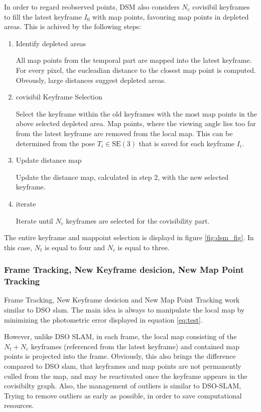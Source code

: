 	In order to regard reobserved points, DSM also considers $N_c$ covisibil keyframes to fill the latest keyframe $I_0$ with map points, favouring 
	map points in depleted areas. This is achived by the following steps: 
	
	\begin{enumerate}
	\item{Identify depleted areas}
	
	All map points from the temporal part are mapped into the latest keyframe. For every pixel, the eucleadian distance to the closest map point 
	is computed. Obvously, large distances suggest depleted areas.
	
	\item{covisibil Keyframe Selection}
	
	Select the keyframe within the old keyframes with the most map points in the above selected depleted area. Map points, where the viewing angle 
	lies too far from the latest keyframe are removed from the local map. 
	This can be determined from the pose $T_i \in \text{SE}(3)$ that is saved for each keyframe $I_i$. 
	
	\item{Update distance map}
	
	Update the distance map, calculated in step 2, with the new selected keyframe. 
	
	\item{iterate}
	
	Iterate until $N_c$ keyframes are selected for the covisibility part. 
	
	\end{enumerate}
	
	The entire keyframe and mappoint selection is displayd in figure \ref{fig:dsm_fig}. In this case, $N_t$ is equal to four and $N_c$ is equal to three.
	
	
	\subsubsection{Frame Tracking, New Keyframe desicion, New Map Point Tracking}
	
	Frame Tracking, New Keyframe desicion and New Map Point Tracking work similar to DSO slam. The main idea is always to manipulate the local map 
	by minimizing the photometric error displayed in equation \ref{eq:test}. 

	However, unlike DSO SLAM, in each frame, the local map 
	consisting of the $N_t + N_c$ keyframes (referenced from the latest keyframe) and contained map points is projected into the frame. 
	Obviously, this also brings the difference compared to DSO slam, that keyframes and map points are not permanently culled from the 
	map, and may be reactivated once the keyframe appears in the covisibilty graph. Also, the management of outliers is similar to DSO-SLAM, 
	Trying to remove outliers as early as possible, in order to save computational resources. 
 
 